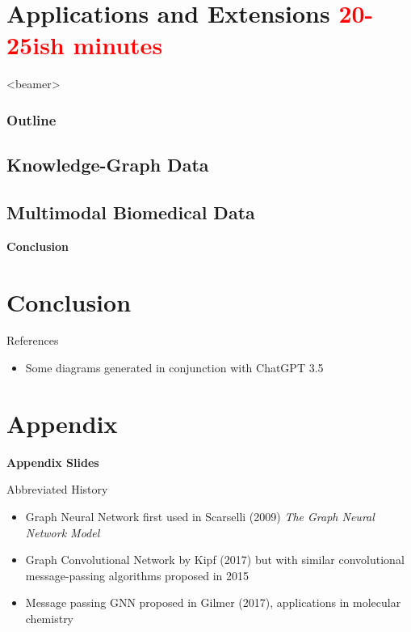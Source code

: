 \documentclass{beamer}
\newcommand{\OutlineRedux}
{
  \begin{frame}<beamer>
    \frametitle{Outline}
    \tableofcontents[currentsection]
  \end{frame}
}
\begin{document}
\section{Applications and Extensions \textcolor{red}{20-25ish minutes}}
\OutlineRedux


\subsection{Knowledge-Graph Data}

\subsection{Multimodal Biomedical Data}




\begin{frame}{}
    \bf{\LARGE Conclusion}    
\end{frame}

\section*{Conclusion}



\begin{frame}[allowframebreaks]{References}
    \begin{itemize}
    \item Some diagrams generated in conjunction with ChatGPT 3.5
    \end{itemize}
    \printbibliography 
\end{frame}



\section*{Appendix}

\begin{frame}{}
\bf{\LARGE Appendix Slides}    
\end{frame}

\begin{frame}{Abbreviated History}
    \begin{itemize}
        \item Graph Neural Network first used in Scarselli (2009) {\it The Graph Neural Network Model} \cite{scarselli_graph_2009}
        \item Graph Convolutional Network by Kipf (2017) \cite{kipf_semi-supervised_2017} but with similar convolutional message-passing algorithms proposed in 2015 \cite{duvenaud_convolutional_2015}
        \item Message passing GNN proposed in Gilmer (2017), applications in molecular chemistry \cite{gilmer_neural_2017} 
    \end{itemize}
\end{frame}
\end{document}
